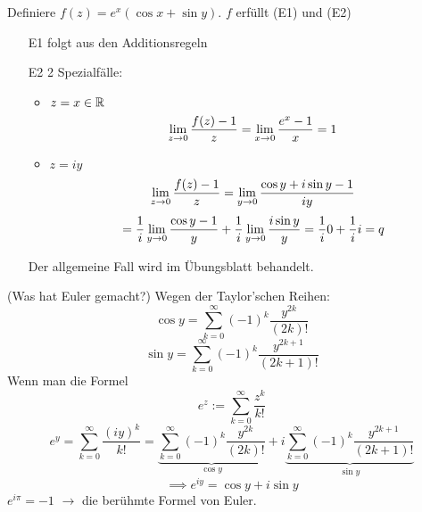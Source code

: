 \begin{Bew}
  Definiere $f(z)=e^x(\cos x+\sin y)$.
  $f$ erfüllt (E1) und (E2) %
  \begin{itemize}
    \item[E1] folgt aus den Additionsregeln
    \item[E2] 2 Spezialfälle:
      \begin{itemize}
        \item $z=x\in\mathbb{R}$
          \[\displaystyle\lim_{z\rightarrow0}\frac{f(z)-1}{z}=\displaystyle\lim_{x\rightarrow0}\frac{e^x-1}{x}=1\]
        \item $z=iy$
          \[\displaystyle\lim_{z\rightarrow0}\frac{f(z)-1}{z}=\displaystyle\lim_{y\rightarrow0}\frac{\cos y+i\sin y-1}{iy}\]
          \[=\frac{1}{i}\displaystyle\lim_{y\rightarrow0}\frac{\cos y-1}{y}+\frac{1}{i}\displaystyle\lim_{y\rightarrow0}\frac{i\sin y}{y}=\frac{1}{i}0+\frac{1}{i}i=q\]
      \end{itemize}
      Der allgemeine Fall wird im Übungsblatt behandelt.
  \end{itemize}
\end{Bew}
\begin{Bem}(Was hat Euler gemacht?) Wegen der Taylor'schen Reihen:
  \[\cos y=\sum_{k=0}^\infty(-1)^k\frac{y^{2k}}{(2k)!}\]
  \[\sin y=\sum_{k=0}^\infty(-1)^k\frac{y^{2k+1}}{(2k+1)!}\]
  Wenn man die Formel
  \[e^z:=\sum^\infty_{k=0}\frac{z^k}{k!}\]
  \[e^y=\sum^\infty_{k=0}\frac{(iy)^k}{k!}=\underbrace{\sum_{k=0}^\infty(-1)^k\frac{y^{2k}}{(2k)!}}_{\cos y}+i\underbrace{\sum_{k=0}^\infty(-1)^k\frac{y^{2k+1}}{(2k+1)!}}_{\sin y}\]
  \[\implies e^{iy}=\cos y+i\sin y\]
  $e^{i\pi}=-1$ $\to$ die berühmte Formel von Euler.
\end{Bem}
